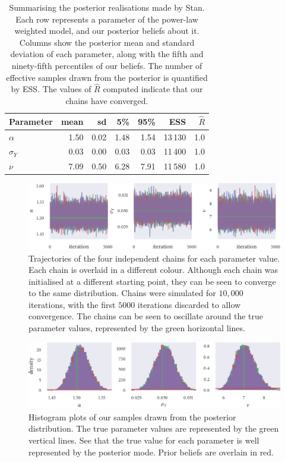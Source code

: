 \begin{table}[p]
  \begin{tabular}{@{}lrrrrrr@{}}
    \toprule
    Parameter    & mean & sd   & 5\%  & 95\% & ESS     & $\widehat{R}$ \\
    \midrule
    $\alpha$     & 1.50 & 0.02 & 1.48 & 1.54 & 13\,130 & 1.0           \\
    $\sigma_{Y}$ & 0.03 & 0.00 & 0.03 & 0.03 & 11\,400 & 1.0           \\
    $\nu$        & 7.09 & 0.50 & 6.28 & 7.91 & 11\,580 & 1.0           \\
    \bottomrule
  \end{tabular}
  \caption{Summarising the posterior realisations made by Stan. Each row represents a
    parameter of the power-law weighted model, and our posterior beliefs about it.
    Columns show the posterior mean and standard deviation of each parameter, along with
    the fifth and ninety-fifth percentiles of our beliefs. The number of effective
    samples drawn from the posterior is quantified by ESS. The values of
    $\widehat{R}$ computed indicate that our chains have converged.}
  \label{tab:power_sim_study_summary}
\end{table}
\begin{figure}[p]
  \includegraphics{stan_power_trace.pdf}
  \caption{Trajectories of the four independent chains for each parameter
    value. Each chain is overlaid in a different colour. Although each chain
    was initialised at a different starting point, they can be seen to
    converge to the same distribution. Chains were simulated for $10,000$
    iterations, with the first $5000$ iterations discarded to allow convergence.
    The chains can be seen to oscillate around the true parameter values,
    represented by the green horizontal lines.}
  \label{fig:power_sim_study_chains}
\end{figure}
\begin{figure}[p]
  \includegraphics{stan_power_hist.pdf}
  \caption{Histogram plots of our samples drawn from the posterior distribution. The true
    parameter values are represented by the green vertical lines. See that the true value
    for each parameter is well represented by the posterior mode. Prior beliefs are overlain
    in red.}
  \label{fig:power_sim_study_hists}
\end{figure}

